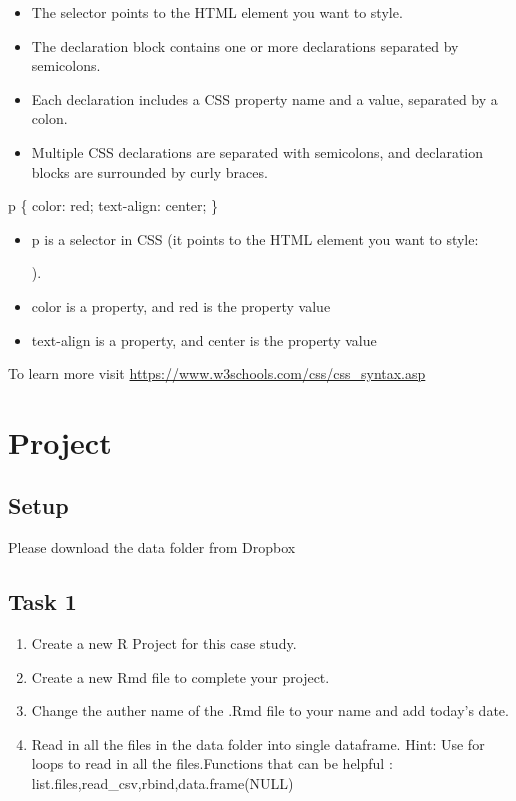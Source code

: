 \documentclass[
]{book}
\providecommand{\tightlist}{%
  \setlength{\itemsep}{0pt}\setlength{\parskip}{0pt}}
\begin{document}
\begin{itemize}
\item
  The selector points to the HTML element you want to style.
\item
  The declaration block contains one or more declarations separated by semicolons.
\item
  Each declaration includes a CSS property name and a value, separated by a colon.
\item
  Multiple CSS declarations are separated with semicolons, and declaration blocks are surrounded by curly braces.
\end{itemize}

p \{
color: red;
text-align: center;
\}

\begin{itemize}
\tightlist
\item
  p is a selector in CSS (it points to the HTML element you want to style:

  ).
\item
  color is a property, and red is the property value
\item
  text-align is a property, and center is the property value
\end{itemize}

To learn more visit \url{https://www.w3schools.com/css/css_syntax.asp}

\hypertarget{project}{%
\chapter{Project}\label{project}}

\hypertarget{setup-1}{%
\section{Setup}\label{setup-1}}

Please download the data folder from Dropbox

\hypertarget{task-1}{%
\section{Task 1}\label{task-1}}

\begin{enumerate}
\def\labelenumi{\arabic{enumi}.}
\tightlist
\item
  Create a new R Project for this case study.
\item
  Create a new Rmd file to complete your project.
\item
  Change the auther name of the .Rmd file to your name and add today's date.
\item
  Read in all the files in the data folder into single dataframe. Hint: Use for loops to read in all the files.Functions that can be helpful : list.files,read\_csv,rbind,data.frame(NULL)
\end{enumerate}
\end{document}
